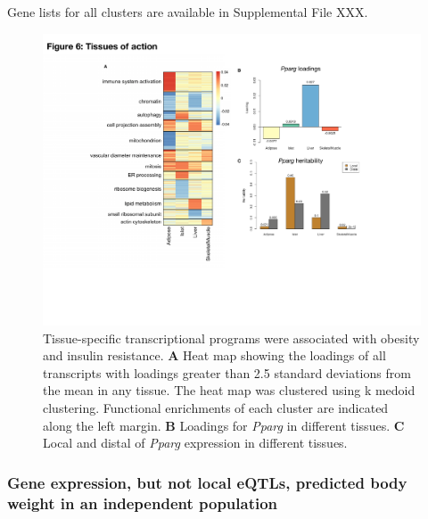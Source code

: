 \documentclass[
]{article}
\begin{document}
Gene lists for all clusters are available in Supplemental File XXX.

\begin{figure}[ht!]
\includegraphics[width=\textwidth]{Figures/Fig6_TOA.pdf} 
\caption{Tissue-specific transcriptional programs were associated 
with obesity and insulin resistance. \textbf{A} Heat map showing 
the loadings of all transcripts with loadings greater than 2.5 
standard deviations from the mean in any tissue. The heat map was 
clustered using k medoid clustering. Functional enrichments of each 
cluster are indicated along the left margin. \textbf{B} Loadings for 
\textit{Pparg} in different tissues. \textbf{C} Local and distal of 
\textit{Pparg} expression in different tissues.
}
\label{fig:toa}
\end{figure}

\subsubsection{Gene expression, but not local eQTLs, predicted body
weight in an independent
population}\label{gene-expression-but-not-local-eqtls-predicted-body-weight-in-an-independent-population}
\end{document}
